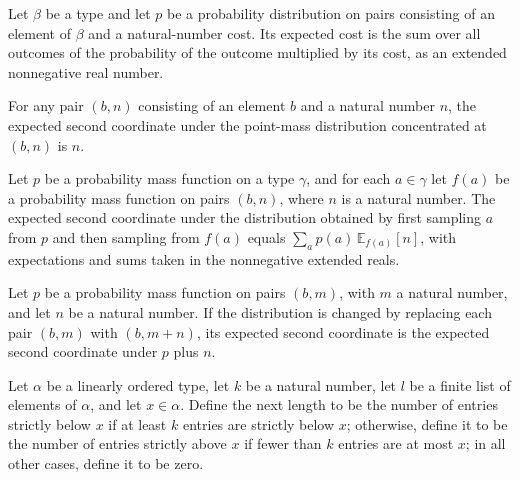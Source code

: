 \begin{definition}
\label{Randomized.expCost}
\leanok
Let $\beta$ be a type and let $p$ be a probability distribution on pairs consisting of
an element of $\beta$ and a natural-number cost. Its expected cost is the sum over all
outcomes of the probability of the outcome multiplied by its cost, as an extended
nonnegative real number.
\end{definition}

\begin{lemma}
\label{Randomized.expCost_pure}
\leanok
{}
For any pair $(b,n)$ consisting of an element $b$ and a natural number $n$, the expected
second coordinate under the point-mass distribution concentrated at $(b,n)$ is $n$.
\end{lemma}

\begin{lemma}
\label{Randomized.expCost_bind}
\leanok
{}
Let $p$ be a probability mass function on a type $\gamma$, and for each $a \in \gamma$
let $f(a)$ be a probability mass function on pairs $(b,n)$, where $n$ is a natural
number. The expected second coordinate under the distribution obtained by first sampling
$a$ from $p$ and then sampling from $f(a)$ equals $\sum_a p(a)\,\mathbb{E}_{f(a)}[n]$,
with expectations and sums taken in the nonnegative extended reals.
\end{lemma}

\begin{lemma}
\label{Randomized.expCost_map_add}
\leanok
{}
Let $p$ be a probability mass function on pairs $(b,m)$, with $m$ a natural number, and
let $n$ be a natural number. If the distribution is changed by replacing each pair
$(b,m)$ with $(b,m+n)$, its expected second coordinate is the expected second coordinate
under $p$ plus $n$.
\end{lemma}

\begin{definition}
\label{Randomized.nextLength}
\leanok
Let $\alpha$ be a linearly ordered type, let $k$ be a natural number, let $l$ be a
finite list of elements of $\alpha$, and let $x\in\alpha$. Define the next length to be
the number of entries strictly below $x$ if at least $k$ entries are strictly below $x$;
otherwise, define it to be the number of entries strictly above $x$ if fewer than $k$
entries are at most $x$; in all other cases, define it to be zero.
\end{definition}


